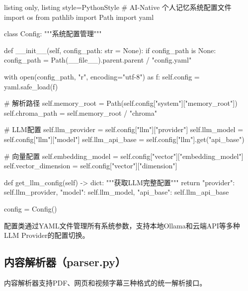 \documentclass[12pt,a4paper,oneside]{article}
\begin{document}
\begin{tcblisting}{listing only, listing style=PythonStyle}
# AI-Native 个人记忆系统配置文件
import os
from pathlib import Path
import yaml

class Config:
    """系统配置管理"""

    def __init__(self, config_path: str = None):
        if config_path is None:
            config_path = Path(__file__).parent.parent / "config.yaml"

        with open(config_path, "r", encoding="utf-8") as f:
            self.config = yaml.safe_load(f)

        # 解析路径
        self.memory_root = Path(self.config["system"]["memory_root"])
        self.chroma_path = self.memory_root / "chroma"

        # LLM配置
        self.llm_provider = self.config["llm"]["provider"]
        self.llm_model = self.config["llm"]["model"]
        self.llm_api_base = self.config["llm"].get("api_base")

        # 向量配置
        self.embedding_model = self.config["vector"]["embedding_model"]
        self.vector_dimension = self.config["vector"]["dimension"]

    def get_llm_config(self) -> dict:
        """获取LLM完整配置"""
        return {
            "provider": self.llm_provider,
            "model": self.llm_model,
            "api_base": self.llm_api_base
        }

config = Config()
\end{tcblisting}

配置类通过YAML文件管理所有系统参数，支持本地Ollama和云端API等多种LLM Provider的配置切换。

\subsection{内容解析器（parser.py）}

内容解析器支持PDF、网页和视频字幕三种格式的统一解析接口。
\end{document}
